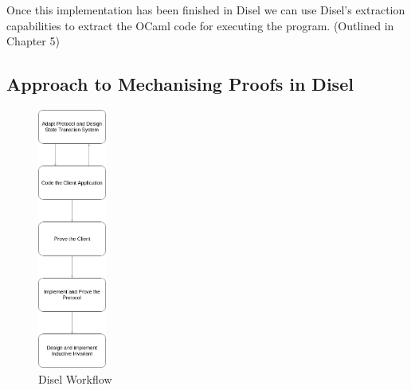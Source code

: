 Once this implementation has been finished in Disel we can use Disel's extraction
capabilities to extract the OCaml code for executing the program. (Outlined in Chapter 5)


\subsection{Approach to Mechanising Proofs in Disel}
\begin{figure}
\centering
\includegraphics[width=0.2\textwidth]{figures/disel_workflow.png}
\caption{Disel Workflow
\label{fig:myInlineFigure}}
\end{figure}

%
%
%
%
%
%
%
%
%

